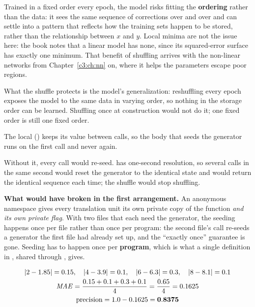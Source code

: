 Trained in a fixed order every epoch, the model risks fitting the \textbf{ordering} rather than the
data: it sees the same sequence of corrections over and over and can settle into a pattern that
reflects how the training sets happen to be stored, rather than the relationship between $x$ and
$y$. Local minima are not the issue here: the book notes that a linear model has none, since its
squared-error surface has exactly one minimum. That benefit of shuffling arrives with the
non-linear networks from Chapter~\ref{c3:ch:nn} on, where it helps the parameters escape poor
regions. 

What the shuffle protects is the model's generalization: reshuffling every epoch exposes the model
to the same data in varying order, so nothing in the storage order can be learned. Shuffling once
at construction would not do it; one fixed order is still one fixed order. 

The  local () keeps its value between calls, so the body that seeds
the generator runs on the first call and never again. 

Without it, every call would re-seed.  has one-second
resolution, so several calls in the same second would reset the generator to the identical state
and  would return the identical sequence each time; the shuffle would stop
shuffling. 

\textbf{What would have broken in the first arrangement.} An anonymous namespace gives every
translation unit its own private copy of the function \emph{and its own private 
flag}. With two  files that each need the generator, the seeding happens once per file
rather than once per program: the second file's call re-seeds a generator the first file had already
set up, and the ``exactly once'' guarantee is gone. Seeding has to happen once per
\textbf{program}, which is what a single definition in , shared through
, gives. 

\begin{gather*}
  \lvert 2 - 1.85\rvert = 0.15, \quad \lvert 4 - 3.9\rvert = 0.1, \quad
  \lvert 6 - 6.3\rvert = 0.3, \quad \lvert 8 - 8.1\rvert = 0.1 \\
  \mathit{MAE} = \frac{0.15 + 0.1 + 0.3 + 0.1}{4} = \frac{0.65}{4} = 0.1625 \\
  \text{precision} = 1.0 - 0.1625 = \mathbf{0.8375}
\end{gather*}

